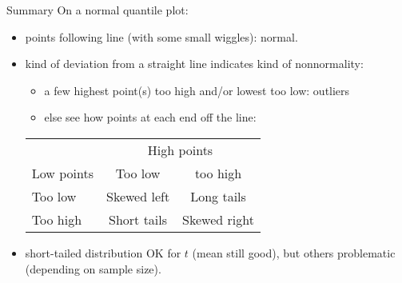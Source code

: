 \documentclass[
  ignorenonframetext,
]{beamer}
\providecommand{\tightlist}{%
  \setlength{\itemsep}{0pt}\setlength{\parskip}{0pt}}
\begin{document}
\begin{frame}{Summary}
\protect\hypertarget{summary}{}
On a normal quantile plot:

\begin{itemize}
\tightlist
\item
  points following line (with some small wiggles): normal.
\item
  kind of deviation from a straight line indicates kind of nonnormality:

  \begin{itemize}
  \tightlist
  \item
    a few highest point(s) too high and/or lowest too low: outliers
  \item
    else see how points at each end off the line:
  \end{itemize}

  \begin{tabular}{lcc}
  & \multicolumn{2}{c}{High points}\\
  Low points & Too low & too high\\
  \hline
  Too low & Skewed left & Long tails\\
  Too high & Short tails & Skewed right \\
  \hline

  \end{tabular}
\item
  short-tailed distribution OK for \(t\) (mean still good), but others
  problematic (depending on sample size).
\end{itemize}
\end{frame}
\end{document}
